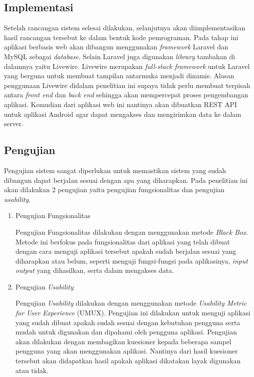 \subsection{Implementasi}
Setelah rancangan sistem selesai dilakukan, selanjutnya akan diimplementasikan hasil rancangan tersebut ke dalam bentuk kode pemrograman. Pada tahap ini aplikasi berbasis web akan dibangun menggunakan \textit{framework} Laravel dan MySQL sebagai \textit{database}. Selain Laravel juga digunakan \textit{library} tambahan di dalamnya yaitu Livewire. Livewire merupakan \textit{full-stack framework} untuk Laravel yang berguna untuk membuat tampilan antarmuka menjadi dinamis. Alasan penggunaan Livewire didalam penelitian ini supaya tidak perlu membuat terpisah antara \textit{front end} dan \textit{back end} sehingga akan mempercepat proses pengembangan aplikasi. Kemudian dari aplikasi web ini nantinya akan dibuatkan REST API untuk aplikasi Android agar dapat mengakses dan mengirimkan data ke dalam server.

\subsection{Pengujian}
Pengujian sistem sangat diperlukan untuk memastikan sistem yang sudah dibangun dapat berjalan sesuai dengan apa yang diharapkan. Pada penelitian ini akan dilakukan 2 pengujian yaitu pengujian fungsionalitas dan pengujian \textit{usability}.

\begin{enumerate}
	\item Pengujian Fungsionalitas
	\par Pengujian Fungsionalitas dilakukan dengan menggunakan metode \textit{Black Box}. Metode ini berfokus pada fungsionalitas dari aplikasi yang telah dibuat dengan cara menguji aplikasi tersebut apakah sudah berjalan sesuai yang diharapkan atau belum, seperti menguji fungsi-fungsi pada aplikasinya, \textit{input output} yang dihasilkan, serta dalam mengakses data.
	\item Pengujian \textit{Usability}
	\par Pengujian \textit{Usability} dilakukan dengan menggunakan metode \textit{Usability Metric for User Experience} (UMUX). Pengujian ini dilakukan untuk menguji aplikasi yang sudah dibuat apakah sudah sesuai dengan kebutuhan pengguna serta mudah untuk digunakan dan dipahami oleh pengguna aplikasi. Pengujian akan dilakukan dengan membagikan kuesioner kepada beberapa sampel pengguna yang akan menggunakan aplikasi. Nantinya dari hasil kuesioner tersebut akan didapatkan hasil apakah aplikasi dikatakan layak digunakan atau tidak. 
\end{enumerate}

